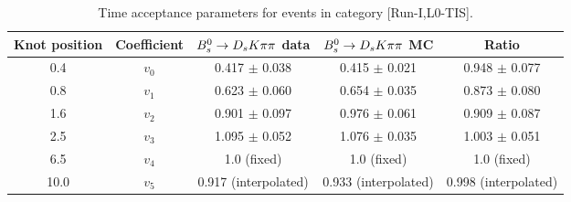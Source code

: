 \begin{table}[hp!]
\centering
\small
\caption{Time acceptance parameters for events in category [\textsf{Run-I},\textsf{L0-TIS}].}
\begin{tabular}{c c c c c}
\hline
\hline
Knot position & Coefficient & ${{B}^0_{s}}\rightarrow{\ensuremath{{D}_{s}}}{\ensuremath{K}}{\ensuremath{\pi}}{\ensuremath{\pi}}$ data & ${{B}^0_{s}}\rightarrow{\ensuremath{{D}_{s}}}{\ensuremath{K}}{\ensuremath{\pi}}{\ensuremath{\pi}}$ MC & Ratio \\
\hline
0.4 & $v_{0}$ & 0.417 $\pm$ 0.038 & 0.415 $\pm$ 0.021 & 0.948 $\pm$ 0.077\\
0.8 & $v_{1}$ & 0.623 $\pm$ 0.060 & 0.654 $\pm$ 0.035 & 0.873 $\pm$ 0.080\\
1.6 & $v_{2}$ & 0.901 $\pm$ 0.097 & 0.976 $\pm$ 0.061 & 0.909 $\pm$ 0.087\\
2.5 & $v_{3}$ & 1.095 $\pm$ 0.052 & 1.076 $\pm$ 0.035 & 1.003 $\pm$ 0.051\\
6.5 & $v_{4}$ &  1.0 (fixed) & 1.0 (fixed) & 1.0 (fixed)\\
10.0 & $v_{5}$ & 0.917 (interpolated) & 0.933 (interpolated) & 0.998 (interpolated) \\
\hline
\hline
\end{tabular}
\label{table:splines}
\end{table}